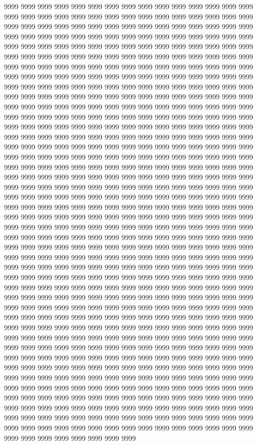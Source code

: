 9999 9999 9999 9999 9999 9999 9999 9999 9999 9999 9999 9999 9999 9999 9999 9999 9999 9999 9999 9999 9999 9999 9999 9999 9999 9999 9999 9999 9999 9999 9999 9999 9999 9999 9999 9999 9999 9999 9999 9999 9999 9999 9999 9999 9999 9999 9999 9999 9999 9999 9999 9999 9999 9999 9999 9999 9999 9999 9999 9999 9999 9999 9999 9999 9999 9999 9999 9999 9999 9999 9999 9999 9999 9999 9999 9999 9999 9999 9999 9999 9999 9999 9999 9999 9999 9999 9999 9999 9999 9999 9999 9999 9999 9999 9999 9999 9999 9999 9999 9999 9999 9999 9999 9999 9999 9999 9999 9999 9999 9999 9999 9999 9999 9999 9999 9999 9999 9999 9999 9999 9999 9999 9999 9999 9999 9999 9999 9999 9999 9999 9999 9999 9999 9999 9999 9999 9999 9999 9999 9999 9999 9999 9999 9999 9999 9999 9999 9999 9999 9999 9999 9999 9999 9999 9999 9999 9999 9999 9999 9999 9999 9999 9999 9999 9999 9999 9999 9999 9999 9999 9999 9999 9999 9999 9999 9999 9999 9999 9999 9999 9999 9999 9999 9999 9999 9999 9999 9999 9999 9999 9999 9999 9999 9999 9999 9999 9999 9999 9999 9999 9999 9999 9999 9999 9999 9999 9999 9999 9999 9999 9999 9999 9999 9999 9999 9999 9999 9999 9999 9999 9999 9999 9999 9999 9999 9999 9999 9999 9999 9999 9999 9999 9999 9999 9999 9999 9999 9999 9999 9999 9999 9999 9999 9999 9999 9999 9999 9999 9999 9999 9999 9999 9999 9999 9999 9999 9999 9999 9999 9999 9999 9999 9999 9999 9999 9999 9999 9999 9999 9999 9999 9999 9999 9999 9999 9999 9999 9999 9999 9999 9999 9999 9999 9999 9999 9999 9999 9999 9999 9999 9999 9999 9999 9999 9999 9999 9999 9999 9999 9999 9999 9999 9999 9999 9999 9999 9999 9999 9999 9999 9999 9999 9999 9999 9999 9999 9999 9999 9999 9999 9999 9999 9999 9999 9999 9999 9999 9999 9999 9999 9999 9999 9999 9999 9999 9999 9999 9999 9999 9999 9999 9999 9999 9999 9999 9999 9999 9999 9999 9999 9999 9999 9999 9999 9999 9999 9999 9999 9999 9999 9999 9999 9999 9999 9999 9999 9999 9999 9999 9999 9999 9999 9999 9999 9999 9999 9999 9999 9999 9999 9999 9999 9999 9999 9999 9999 9999 9999 9999 9999 9999 9999 9999 9999 9999 9999 9999 9999 9999 9999 9999 9999 9999 9999 9999 9999 9999 9999 9999 9999 9999 9999 9999 9999 9999 9999 9999 9999 9999 9999 9999 9999 9999 9999 9999 9999 9999 9999 9999 9999 9999 9999 9999 9999 9999 9999 9999 9999 9999 9999 9999 9999 9999 9999 9999 9999 9999 9999 9999 9999 9999 9999 9999 9999 9999 9999 9999 9999 9999 9999 9999 9999 9999 9999 9999 9999 9999 9999 9999 9999 9999 9999 9999 9999 9999 9999 9999 9999 9999 9999 9999 9999 9999 9999 9999 9999 9999 9999 9999 9999 9999 9999 9999 9999 9999 9999 9999 9999 9999 9999 9999 9999 9999 9999 9999 9999 9999 9999 9999 9999 9999 9999 9999 9999 9999 9999 9999 9999 9999 9999 9999 9999 9999 9999 9999 9999 9999 9999 9999 9999 9999 9999 9999 9999 9999 9999 9999 9999 9999 9999 9999 9999 9999 9999 9999 9999 9999 9999 9999 9999 9999 9999 9999 9999 9999 9999 9999 9999 9999 9999 9999 9999 9999 9999 9999 9999 9999 9999 9999 9999 9999 9999 9999 9999 9999 9999 9999 9999 9999 9999 9999 9999 9999 9999 9999 9999 9999 9999 9999 9999 9999 9999 9999 9999 9999 9999 9999 9999 9999 9999 9999 9999 9999 9999 9999 9999 9999 9999 9999 9999 9999 9999 9999 9999 9999 9999 9999 9999 9999 9999 9999 9999 9999 9999 9999 9999 9999 9999 9999 9999 9999 9999 9999 9999 9999 9999 9999 9999 9999 9999 9999 9999 9999 9999 9999 9999 9999 9999 9999 9999 9999 9999 9999 
